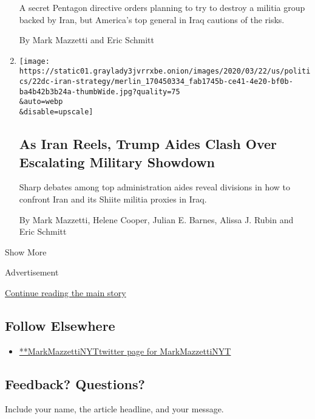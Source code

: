 \begin{enumerate}
  A secret Pentagon directive orders planning to try to destroy a
  militia group backed by Iran, but America's top general in Iraq
  cautions of the risks.

  By Mark Mazzetti and Eric Schmitt
\item
  \href{/2020/03/21/world/middleeast/trump-iran-iraq-coronavirus-militas.html}{}

  \texttt{[image: https://static01.graylady3jvrrxbe.onion/images/2020/03/22/us/politics/22dc-iran-strategy/merlin\_170450334\_fab1745b-ce41-4e20-bf0b-ba4b42b3b24a-thumbWide.jpg?quality=75\\\&auto=webp\\\&disable=upscale]}

  \hypertarget{as-iran-reels-trump-aides-clash-over-escalating-military-showdown}{%
  \subsection{As Iran Reels, Trump Aides Clash Over Escalating Military
  Showdown}\label{as-iran-reels-trump-aides-clash-over-escalating-military-showdown}}

  Sharp debates among top administration aides reveal divisions in how
  to confront Iran and its Shiite militia proxies in Iraq.

  By Mark Mazzetti, Helene Cooper, Julian E. Barnes, Alissa J. Rubin and
  Eric Schmitt
\end{enumerate}

Show More

Advertisement

\protect\hyperlink{after-mid2}{Continue reading the main story}

\hypertarget{follow-elsewhere}{%
\subsection{Follow Elsewhere}\label{follow-elsewhere}}

\begin{itemize}
\tightlist
\item
  \href{https://twitter.com/MarkMazzettiNYT}{**MarkMazzettiNYTtwitter
  page for MarkMazzettiNYT}
\end{itemize}

\hypertarget{feedback-questions}{%
\subsection{Feedback? Questions?}\label{feedback-questions}}

Include your name, the article headline, and your message.

